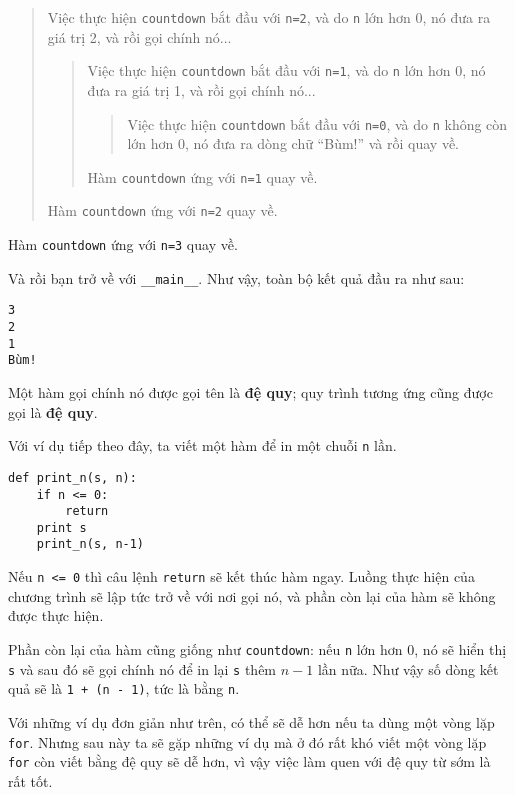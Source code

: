 \documentclass[11pt]{book}
\begin{document}
\begin{quote}
Việc thực hiện {\tt countdown} bắt đầu với {\tt n=2}, và do 
{\tt n} lớn hơn 0, nó đưa ra giá trị 2, và rồi gọi chính nó...

\begin{quote}
Việc thực hiện {\tt countdown} bắt đầu với {\tt n=1}, và do 
{\tt n} lớn hơn 0, nó đưa ra giá trị 1, và rồi gọi chính nó...

\begin{quote}
Việc thực hiện {\tt countdown} bắt đầu với {\tt n=0}, và do 
{\tt n} không còn lớn hơn 0, nó đưa ra dòng chữ ``Bùm!'' và rồi
quay về.

\end{quote}

Hàm {\tt countdown} ứng với {\tt n=1} quay về.
\end{quote}

Hàm {\tt countdown} ứng với {\tt n=2} quay về.
\end{quote}

Hàm {\tt countdown} ứng với {\tt n=3} quay về.

Và rồi bạn trở về với \verb"__main__".  Như vậy,
toàn bộ kết quả đầu ra như sau:

\beforeverb
\begin{verbatim}
3
2
1
Bùm!
\end{verbatim}
\afterverb
%
Một hàm gọi chính nó được gọi tên là {\bf đệ quy}; quy trình
tương ứng cũng được gọi là {\bf đệ quy}.


Với ví dụ tiếp theo đây, ta viết một hàm để in một chuỗi
{\tt n} lần.

\beforeverb
\begin{verbatim}
def print_n(s, n):
    if n <= 0:
        return
    print s
    print_n(s, n-1)
\end{verbatim}
\afterverb
%
Nếu {\tt n <= 0} thì câu lệnh {\tt return} sẽ kết thúc hàm ngay.  Luồng 
thực hiện của chương trình sẽ lập tức trở về với nơi gọi nó, và phần còn
lại của hàm sẽ không được thực hiện.


Phần còn lại của hàm cũng giống như {\tt countdown}: nếu {\tt n} 
lớn hơn 0, nó sẽ hiển thị {\tt s} và sau đó sẽ gọi chính nó để in lại
{\tt s} thêm $n-1$ lần nữa. Như vậy số dòng kết quả sẽ là 
{\tt 1 + (n - 1)}, tức là bằng {\tt n}.

Với những ví dụ đơn giản như trên, có thể sẽ dễ hơn nếu ta 
dùng một vòng lặp {\tt for}. Nhưng sau này ta sẽ gặp những ví dụ
mà ở đó rất khó viết một vòng lặp {\tt for} còn viết bằng đệ quy
sẽ dễ hơn, vì vậy việc làm quen với đệ quy từ sớm là rất tốt.
\end{document}
